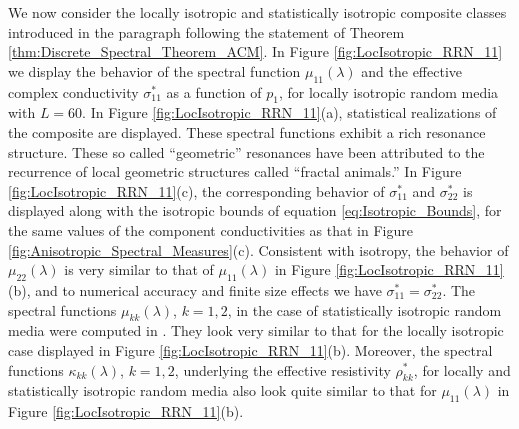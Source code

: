 \documentclass{cmslatex}
\begin{document}
We now consider the locally isotropic and statistically isotropic
composite classes introduced 
in the paragraph following the statement of Theorem
\ref{thm:Discrete_Spectral_Theorem_ACM}. In Figure
\ref{fig:LocIsotropic_RRN_11} we display the behavior of the 
spectral function $\mu_{11}(\lambda)$ and the effective complex conductivity
$\sigma^*_{11}$ as a function of $p_1$, for locally isotropic random media
with $L=60$. In Figure \ref{fig:LocIsotropic_RRN_11}(a), statistical
realizations of the composite are displayed. These
spectral functions exhibit a rich resonance structure. These so called
``geometric'' resonances have been attributed
\cite{Jonckheere_Luck_JPA_1998} to the recurrence of local geometric
structures called ``fractal animals.''  In Figure
\ref{fig:LocIsotropic_RRN_11}(c), the corresponding behavior of
$\sigma^*_{11}$ and $\sigma^*_{22}$ is displayed along with the isotropic bounds
of equation \eqref{eq:Isotropic_Bounds}, for the same values of the
component conductivities as that in Figure
\ref{fig:Anisotropic_Spectral_Measures}(c). Consistent with  
isotropy, the behavior of $\mu_{22}(\lambda)$ is very similar to that of
$\mu_{11}(\lambda)$ in Figure \ref{fig:LocIsotropic_RRN_11}(b), and to
numerical accuracy and finite size effects we have
$\sigma^*_{11}=\sigma^*_{22}$. The spectral functions $\mu_{kk}(\lambda)$, $k=1,2$, in
the case of statistically isotropic random media were computed in
\cite{Murphy:JMP:063506}. They look very similar to that for the
locally isotropic case displayed in Figure
\ref{fig:LocIsotropic_RRN_11}(b). Moreover, the spectral functions
$\kappa_{kk}(\lambda)$, $k=1,2$, underlying the effective resistivity $\rho^*_{kk}$,
for locally and statistically isotropic random media also look quite
similar to that for $\mu_{11}(\lambda)$ in Figure
\ref{fig:LocIsotropic_RRN_11}(b). 
\end{document}

